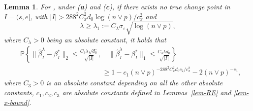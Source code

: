 \documentclass[twoside]{article}
\newtheorem{lemma}[theorem]{Lemma}
\begin{document}
\begin{lemma} \label{lemma:lasso}
For , under (\textbf{a}) and (\textbf{c}), if there exists no true change point in $I = (s, e]$, with $|I| > 288^2 C^2_x d_0 \log(n \vee p)/c_x^2$ and
	\[
		\lambda \geq \lambda_1 := C_{\lambda}\sigma_{\varepsilon} \sqrt{\log(n \vee p)},
	\] 
	where $C_{\lambda} >  0$ being an absolute constant, it holds that
	\begin{align*}
		& \mathbb{P}\left\{\bigl\|\widehat{\beta}^{\lambda}_I - \beta^*_I\bigr\|_2 \leq \frac{C_3 \lambda \sqrt{d_0}} {\sqrt{|I|}}, \quad \bigl\|\widehat{\beta}^{\lambda}_I - \beta^*_I\bigr\|_1 \leq \frac{C_3 \lambda d_0}{\sqrt{|I|}} \right\} \\
		& \hspace{5cm} \geq 	1 - c_1 (n \vee p)^{-288^2C_x^2d_0c_2/c_x^2} - 2(n \vee p)^{-c_3},
	\end{align*}
	where $C_3 > 0$ is an absolute constant depending on all the other absolute constants, $c_1, c_2, c_3$ are absolute constants defined in Lemmas~\ref{lem-RE} and \ref{lem-x-bound}.
\end{lemma}
\end{document}
